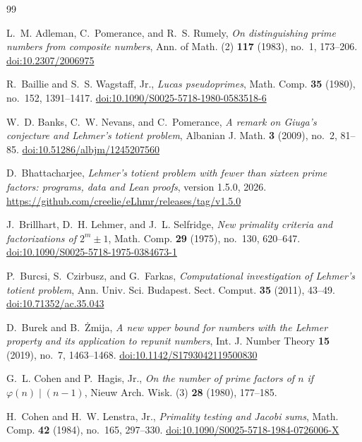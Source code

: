 \documentclass[screen,reqno]{aomart}
\numberwithin{equation}{section}
\theoremstyle{plain}
\theoremstyle{definition}
\theoremstyle{remark}
\begin{document}
\begin{thebibliography}{99}

L.~M. Adleman, C.~Pomerance, and R.~S. Rumely,
\emph{On distinguishing prime numbers from composite numbers},
Ann. of Math. (2) \textbf{117} (1983), no.~1, 173--206.
\href{https://doi.org/10.2307/2006975}{doi:10.2307/2006975}

R.~Baillie and S.~S. Wagstaff, Jr.,
\emph{Lucas pseudoprimes},
Math. Comp. \textbf{35} (1980), no.~152, 1391--1417.
\href{https://doi.org/10.1090/S0025-5718-1980-0583518-6}{doi:10.1090/S0025-5718-1980-0583518-6}

W.~D. Banks, C.~W. Nevans, and C.~Pomerance,
\emph{A remark on Giuga's conjecture and Lehmer's totient problem},
Albanian J. Math. \textbf{3} (2009), no.~2, 81--85.
\href{https://doi.org/10.51286/albjm/1245207560}{doi:10.51286/albjm/1245207560}

D.~Bhattacharjee,
\emph{Lehmer's totient problem with fewer than sixteen prime factors:
programs, data and Lean proofs}, version 1.5.0, 2026.
\url{https://github.com/creelie/eLhmr/releases/tag/v1.5.0}

J.~Brillhart, D.~H. Lehmer, and J.~L. Selfridge,
\emph{New primality criteria and factorizations of $2^m\pm1$},
Math. Comp. \textbf{29} (1975), no.~130, 620--647.
\href{https://doi.org/10.1090/S0025-5718-1975-0384673-1}{doi:10.1090/S0025-5718-1975-0384673-1}

P.~Burcsi, S.~Czirbusz, and G.~Farkas,
\emph{Computational investigation of Lehmer's totient problem},
Ann. Univ. Sci. Budapest. Sect. Comput. \textbf{35} (2011), 43--49.
\href{https://doi.org/10.71352/ac.35.043}{doi:10.71352/ac.35.043}

D.~Burek and B.~\.Zmija,
\emph{A new upper bound for numbers with the Lehmer property and its
application to repunit numbers},
Int. J. Number Theory \textbf{15} (2019), no.~7, 1463--1468.
\href{https://doi.org/10.1142/S1793042119500830}{doi:10.1142/S1793042119500830}

G.~L. Cohen and P.~Hagis, Jr.,
\emph{On the number of prime factors of $n$ if $\varphi(n)\mid(n-1)$},
Nieuw Arch. Wisk. (3) \textbf{28} (1980), 177--185.

H.~Cohen and H.~W. Lenstra, Jr.,
\emph{Primality testing and Jacobi sums},
Math. Comp. \textbf{42} (1984), no.~165, 297--330.
\href{https://doi.org/10.1090/S0025-5718-1984-0726006-X}{doi:10.1090/S0025-5718-1984-0726006-X}


\end{thebibliography}
\end{document}
